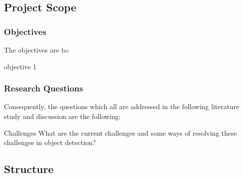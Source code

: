 \subsection{Project Scope}



\subsubsection{Objectives}
\label{sec:primary_objectives}
The objectives are to:
\begin{primaryobjective}
    objective 1
\end{primaryobjective}

\subsubsection{Research Questions}
\label{sec:research_questions}
Consequently, the questions which all are addressed in the following literature study and discussion are the following:

\begin{researchQ}{Challenges}
    What are the current challenges and some ways of resolving these challenges in object detection? 
\end{researchQ}


\subsection{Structure}